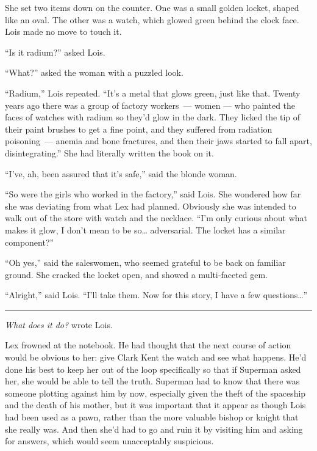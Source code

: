 \documentclass[ebook,12pt]{memoir}
\begin{document}
She set two items down on the counter. One was a small golden locket,
shaped like an oval. The other was a watch, which glowed green behind
the clock face. Lois made no move to touch it.

``Is it radium?'' asked Lois.

``What?'' asked the woman with a puzzled look.

``Radium,'' Lois repeated. ``It's a metal that glows green, just like
that. Twenty years ago there was a group of factory workers~--- women
--- who painted the faces of watches with radium so they'd glow in the
dark. They licked the tip of their paint brushes to get a fine point,
and they suffered from radiation poisoning~--- anemia and bone
fractures, and then their jaws started to fall apart, disintegrating.''
She had literally written the book on it.

``I've, ah, been assured that it's safe,'' said the blonde woman.

``So were the girls who worked in the factory,'' said Lois. She wondered
how far she was deviating from what Lex had planned. Obviously she was
intended to walk out of the store with watch and the necklace. ``I'm
only curious about what makes it glow, I don't mean to be so\ldots{}
adversarial. The locket has a similar component?''

``Oh yes,'' said the saleswomen, who seemed grateful to be back on
familiar ground. She cracked the locket open, and showed a multi‐faceted
gem.

``Alright,'' said Lois. ``I'll take them. Now for this story, I have a
few questions\ldots{}''

\begin{center}\rule{0.5\linewidth}{0.5pt}\end{center}

\emph{What does it do?} wrote Lois.

Lex frowned at the notebook. He had thought that the next course of
action would be obvious to her: give Clark Kent the watch and see what
happens. He'd done his best to keep her out of the loop specifically so
that if Superman asked her, she would be able to tell the truth.
Superman had to know that there was someone plotting against him by now,
especially given the theft of the spaceship and the death of his mother,
but it was important that it appear as though Lois had been used as a
pawn, rather than the more valuable bishop or knight that she really
was. And then she'd had to go and ruin it by visiting him and asking for
answers, which would seem unacceptably suspicious.
\end{document}
